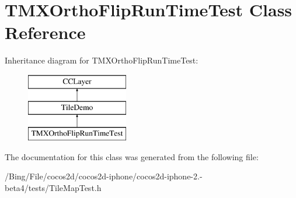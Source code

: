 \hypertarget{interface_t_m_x_ortho_flip_run_time_test}{\section{T\-M\-X\-Ortho\-Flip\-Run\-Time\-Test Class Reference}
\label{interface_t_m_x_ortho_flip_run_time_test}
}
Inheritance diagram for T\-M\-X\-Ortho\-Flip\-Run\-Time\-Test\-:\begin{figure}[H]
\begin{center}
\leavevmode
\includegraphics[height=3.000000cm]{interface_t_m_x_ortho_flip_run_time_test}
\end{center}
\end{figure}


The documentation for this class was generated from the following file\-:\begin{DoxyCompactItemize}
\item 
/\-Bing/\-File/cocos2d/cocos2d-\/iphone/cocos2d-\/iphone-\/2.-\/beta4/tests/Tile\-Map\-Test.\-h\end{DoxyCompactItemize}
